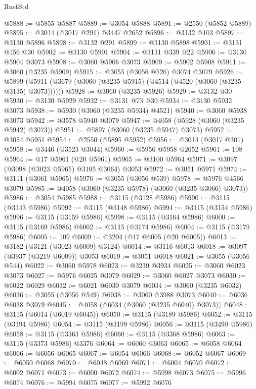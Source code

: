 \begin{lexlean}{RustStd}
\begin{coremodule}
{\begin{coremodule}
{{{{{{{{{{{{{{{{{{{{{{{{{{{{{{{{@5888 := @5855 @5887
@5889 := @3054 @5888
@5891 := @2550 (@5852 @5889)
@5895 := @3014 (@3017 @291) @3447 @2652
@5896 := @3132 @103
@5897 := @3130 @5896
@5898 := @3132 @291
@5899 := @3130 @5898
@5901 := @3131 @156 @30
@5902 := @3130 @5901
@5904 := @3131 @339 @22
@5906 := @3130 @5904 @3073
@5908 := @3060 @5906 @3073
@5909 := @5902 @5908
@5911 := @3060 (@3235 @5909)
@5915 := @3055 (@3056 @526) @3074 @3079
@5926 := @5899 (@5911 (@3679 (@3060 (@3235 @5915) (@4514 (@4520 (@3060 (@3235 @3135) @3073))))))
@5928 := @3060 (@3235 @5926)
@5929 := @3132 @30
@5930 := @3130 @5929
@5932 := @3131 @73 @30
@5934 := @3130 @5932 @3073
@5938 := @5930 (@3060 (@3235 @5934) @4521)
@5940 := @3060 @5938 @3073
@5942 := @3578 @5940 @3079
@5947 := @4058 (@5928 (@3060 (@3235 @5942) @3073))
@5951 := @5897 (@3060 (@3235 @5947) @3073)
@5952 := @3054 @5951
@5954 := @2550 (@5895 @5952)
@5956 := @3014 (@3017 @301)
@5958 := @3446 (@3523 @3044)
@5960 := @5956 @5958 @2652
@5961 := 108
@5964 := @17 @5961 (@20 @5961)
@5965 := @3100 @5964
@5971 := @3097 (@3098 (@3023 @5965) @3105 @3064) @3053
@5972 := @3051 @5971
@5974 := @3111 (@3061 @5965)
@5976 := @3055 (@3056 @539)
@5978 := @5976 @4566 @3079
@5985 := @4058 (@3060 (@3235 @5978) (@3060 (@3235 @3066) @3073))
@5986 := @3054 @5985
@5988 := @3115 (@3128 @5986)
@5990 := @3115 (@3143 @5986)
@5992 := @3115 (@3148 @5986)
@5994 := @3115 (@3154 @5986)
@5996 := @3115 (@3159 @5986)
@5998 := @3115 (@3164 @5986)
@6000 := @3115 (@3169 @5986)
@6002 := @3115 (@3174 @5986)
@6004 := @3115 (@3179 @5986)
@6005 := 109
@6009 := @3204 (@17 @6005 (@20 @6005))
@6013 := @3182 (@3121 (@3023 @6009) @3124)
@6014 := @3116 @6013
@6018 := @3097 (@3937 (@3219 @6009)) @3053
@6019 := @3051 @6018
@6021 := @3055 (@3056 @544)
@6022 := @3060 @5978
@6023 := @3239 @3934
@6025 := @3060 @6023 @3073
@6027 := @5976 @6025 @3079
@6029 := @3060 @6027 @3073
@6030 := @6022 @6029
@6032 := @6021 @6030 @3079
@6034 := @3060 (@3235 @6032)
@6036 := @3055 (@3056 @549)
@6038 := @3060 @3988 @3073
@6040 := @6036 @6038 @3079
@6045 := @4058 (@6034 (@3060 (@3235 @6040) @3073))
@6048 := @3115 (@6014 (@6019 @6045))
@6050 := @3115 (@3189 @5986)
@6052 := @3115 (@3194 @5986)
@6054 := @3115 (@3199 @5986)
@6056 := @3115 (@3490 @5986)
@6058 := @3115 (@3363 @5986)
@6060 := @3115 (@3368 @5986)
@6063 := @3115 (@3373 @5986) @3376
@6064 := @6060 @6063
@6065 := @6058 @6064
@6066 := @6056 @6065
@6067 := @6054 @6066
@6068 := @6052 @6067
@6069 := @6050 @6068
@6070 := @6048 @6069
@6071 := @6004 @6070
@6072 := @6002 @6071
@6073 := @6000 @6072
@6074 := @5998 @6073
@6075 := @5996 @6074
@6076 := @5994 @6075
@6077 := @5992 @6076
}}}}}}}}}}}}}}}}}}}}}}}}}}}}}}}}
\end{coremodule}}
\end{coremodule}
\end{lexlean}
